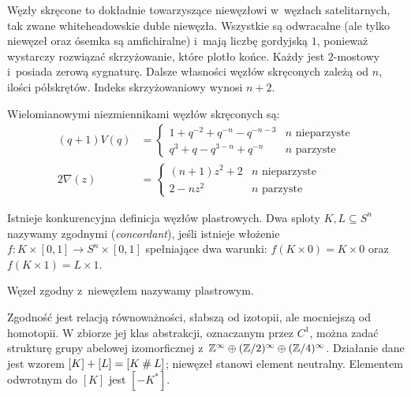 Węzły skręcone to dokładnie towarzyszące niewęzłowi w~węzłach satelitarnych, tak zwane whiteheadowskie duble niewęzła.
Wszystkie są odwracalne (ale tylko niewęzeł oraz ósemka są amfichiralne) i~mają liczbę gordyjską $1$, ponieważ wystarczy rozwiązać skrzyżowanie, które plotło końce.
Każdy jest $2$-mostowy i~posiada zerową sygnaturę.
Dalsze własności węzłów skręconych zależą od $n$, ilości półskrętów.
Indeks skrzyżowaniowy wynosi $n + 2$.

\begin{proposition}
    Wielomianowymi niezmiennikami węzłów skręconych są:
    \begin{align*}
    (q+1)V(q) & = \begin{cases}
        1+q^{-2}+q^{-n}-q^{-n-3} & n \mbox{ nieparzyste} \\
        q^{3}+q-q^{3-n}+q^{-n} & n \mbox{ parzyste}
    \end{cases} \\
    2 \nabla (z) & = \begin{cases}
        (n+1) z^{2} + 2 & n \mbox{ nieparzyste} \\
        2 - nz^2 & n \mbox{ parzyste}
    \end{cases}
    \end{align*}
\end{proposition}


Istnieje konkurencyjna definicja węzłów plastrowych.
Dwa sploty $K, L \subseteq S^n$ nazywamy zgodnymi (\emph{concordant}), jeśli istnieje włożenie $f \colon K \times [0,1] \to S^n \times [0,1]$ spełniające dwa warunki: $f(K \times 0) = K \times 0$ oraz $f(K \times 1) = L \times 1$.

\begin{definition} \label{def:slice_knot}
    Węzeł zgodny z~niewęzłem nazywamy plastrowym.
\end{definition}

Zgodność jest relacją równoważności, słabszą od izotopii, ale mocniejszą od homotopii.
W zbiorze jej klas abstrakcji, oznaczanym przez $C^1$, można zadać strukturę grupy abelowej izomorficznej z~$\mathbb Z^\infty \oplus (\mathbb Z/2)^\infty \oplus (\mathbb Z/4)^\infty$.
Działanie dane jest wzorem $[K] + [L] = [K \mathbin{\#} L]$; niewęzeł stanowi element neutralny.
Elementem odwrotnym do $[K]$ jest $[-K^*]$.

